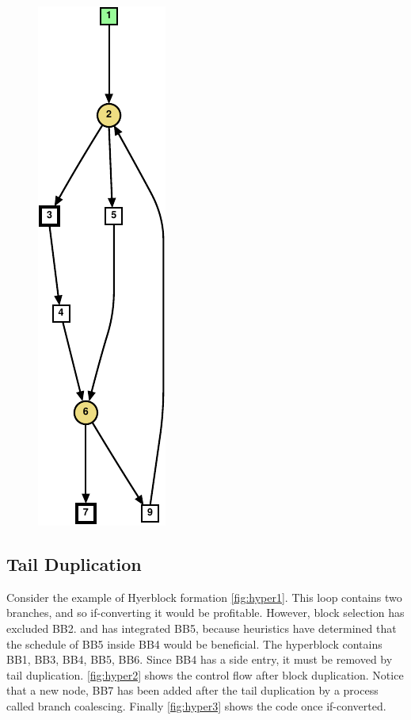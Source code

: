 \begin{figure}
{    \includegraphics[scale=0.6]{graph7}
    \label{fig:wc2}}
\label{fig:wc example}
\end{figure}

\subsection{Tail Duplication}

Consider the example of Hyerblock formation \ref{fig:hyper1}. This loop contains two branches, and so if-converting it would be profitable. However, block selection has excluded BB2. and has integrated BB5, because heuristics have determined that the schedule of BB5 inside BB4 would be beneficial. The hyperblock contains {BB1, BB3, BB4, BB5, BB6}. Since BB4 has a side entry, it must be removed by tail duplication. \ref{fig:hyper2} shows the  control flow after block duplication. Notice that a new node, BB7 has been added after the tail duplication by a process called branch coalescing. Finally \ref{fig:hyper3} shows the code once if-converted.

